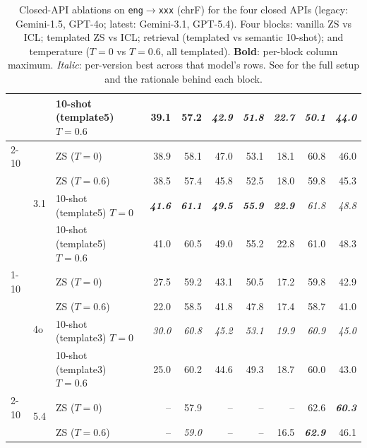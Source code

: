 \begin{table}[t]
\begin{tabular}{lllrrrrrrr}
 &  & 10-shot (template5) $T{=}0.6$ & 39.1 & 57.2 & \emph{42.9} & \emph{51.8} & \emph{22.7} & \emph{50.1} & \emph{44.0} \\
\cmidrule(lr){2-10}
 & \multirow{4}{*}{3.1} & ZS ($T{=}0$) & 38.9 & 58.1 & 47.0 & 53.1 & 18.1 & 60.8 & 46.0 \\
 &  & ZS ($T{=}0.6$) & 38.5 & 57.4 & 45.8 & 52.5 & 18.0 & 59.8 & 45.3 \\
 &  & 10-shot (template5) $T{=}0$ & \textbf{\emph{41.6}} & \textbf{\emph{61.1}} & \textbf{\emph{49.5}} & \textbf{\emph{55.9}} & \textbf{\emph{22.9}} & \emph{61.8} & \emph{48.8} \\
 &  & 10-shot (template5) $T{=}0.6$ & 41.0 & 60.5 & 49.0 & 55.2 & 22.8 & 61.0 & 48.3 \\
\cmidrule(lr){1-10}
\multirow{6}{*}{GPT} & \multirow{4}{*}{4o} & ZS ($T{=}0$) & 27.5 & 59.2 & 43.1 & 50.5 & 17.2 & 59.8 & 42.9 \\
 &  & ZS ($T{=}0.6$) & 22.0 & 58.5 & 41.8 & 47.8 & 17.4 & 58.7 & 41.0 \\
 &  & 10-shot (template3) $T{=}0$ & \emph{30.0} & \emph{60.8} & \emph{45.2} & \emph{53.1} & \emph{19.9} & \emph{60.9} & \emph{45.0} \\
 &  & 10-shot (template3) $T{=}0.6$ & 25.0 & 60.2 & 44.6 & 49.3 & 18.7 & 60.0 & 43.0 \\
\cmidrule(lr){2-10}
 & \multirow{2}{*}{5.4} & ZS ($T{=}0$) & -- & 57.9 & -- & -- & -- & 62.6 & \textbf{\emph{60.3}} \\
 &  & ZS ($T{=}0.6$) & -- & \emph{59.0} & -- & -- & 16.5 & \textbf{\emph{62.9}} & 46.1 \\
\bottomrule
\end{tabular}
\caption{Closed-API ablations on \texttt{eng}$\to$\texttt{xxx} (chrF) for the four closed APIs (legacy: Gemini-1.5, GPT-4o; latest: Gemini-3.1, GPT-5.4). Four blocks: vanilla ZS vs ICL; templated ZS vs ICL; retrieval (templated vs semantic 10-shot); and temperature ($T{=}0$ vs $T{=}0.6$, all templated). \textbf{Bold}: per-block column maximum. \emph{Italic}: per-version best across that model's rows. See  for the full setup and the rationale behind each block.}
\label{tab:closed_ablations_chrf}
\end{table}
